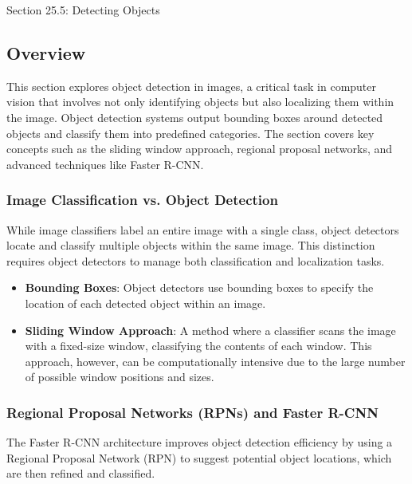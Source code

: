 \begin{notes}{Section 25.5: Detecting Objects}
    \subsection*{Overview}

    This section explores object detection in images, a critical task in computer vision that involves not only identifying objects but also localizing them within the image. Object detection systems output 
    bounding boxes around detected objects and classify them into predefined categories. The section covers key concepts such as the sliding window approach, regional proposal networks, and advanced 
    techniques like Faster R-CNN.
    
    \subsubsection*{Image Classification vs. Object Detection}
    
    While image classifiers label an entire image with a single class, object detectors locate and classify multiple objects within the same image. This distinction requires object detectors to manage both 
    classification and localization tasks.
    
    \begin{highlight}
    
        \begin{itemize}
            \item \textbf{Bounding Boxes}: Object detectors use bounding boxes to specify the location of each detected object within an image.
            \item \textbf{Sliding Window Approach}: A method where a classifier scans the image with a fixed-size window, classifying the contents of each window. This approach, however, can be computationally 
            intensive due to the large number of possible window positions and sizes.
        \end{itemize}
    
    \end{highlight}
    
    \subsubsection*{Regional Proposal Networks (RPNs) and Faster R-CNN}
    
    The Faster R-CNN architecture improves object detection efficiency by using a Regional Proposal Network (RPN) to suggest potential object locations, which are then refined and classified.
    

\end{notes}
